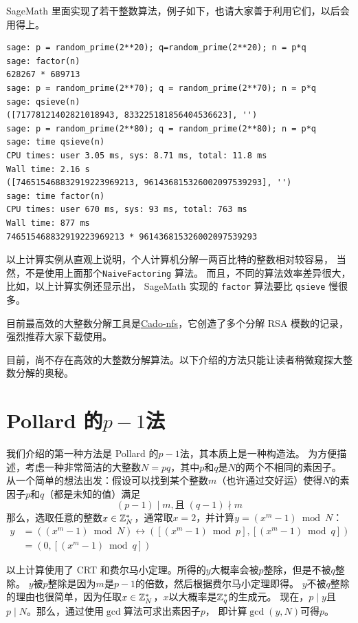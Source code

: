 SageMath 里面实现了若干整数算法，例子如下，也请大家善于利用它们，以后会用得上。
\begin{example}
\begin{lstlisting}
sage: p = random_prime(2**20); q=random_prime(2**20); n = p*q
sage: factor(n)
628267 * 689713
sage: p = random_prime(2**70); q = random_prime(2**70); n = p*q
sage: qsieve(n)
([71778121402821018943, 833225181856404536623], '')
sage: p = random_prime(2**80); q = random_prime(2**80); n = p*q
sage: time qsieve(n)
CPU times: user 3.05 ms, sys: 8.71 ms, total: 11.8 ms
Wall time: 2.16 s
([746515468832919223969213, 961436815326002097539293], '')
sage: time factor(n)
CPU times: user 670 ms, sys: 93 ms, total: 763 ms
Wall time: 877 ms
746515468832919223969213 * 961436815326002097539293
\end{lstlisting}
\end{example}
以上计算实例从直观上说明，个人计算机分解一两百比特的整数相对较容易，
当然，不是使用上面那个\lstinline{NaiveFactoring} 
算法。
而且，不同的算法效率差异很大，
比如，以上计算实例还显示出，
SageMath 实现的
\lstinline|factor|
算法要比 
\lstinline|qsieve| 
慢很多。

目前最高效的大整数分解工具是\href{http://cado-nfs.gforge.inria.fr/}{Cado-nfs}，它创造了多个分解 RSA 模数的记录，强烈推荐大家下载使用。

目前，尚不存在高效的大整数分解算法。以下介绍的方法只能让读者稍微窥探大整数分解的奥秘。
\section{\texorpdfstring{Pollard 的$p - 1$法}{Pollard 的p - 1法}}
\label{sec:pol_p}

我们介绍的第一种方法是 Pollard 的$p - 1$法，其本质上是一种构造法。
为方便描述，考虑一种非常简洁的大整数$N=pq$，其中$p$和$q$是$N$的两个不相同的素因子。
从一个简单的想法出发：假设可以找到某个整数$m$（也许通过交好运）使得$N$的素因子$p$和$q$（都是未知的值）满足
\[(p-1) \mid m, \text{且}\;(q - 1) \nmid m\]
那么，选取任意的整数$x\in {\mathbb Z}_N^*$，通常取$x = 2$，并计算$y = (x^m - 1) \bmod N$：
\begin{align*}
y &= ((x^m - 1) \bmod N) \leftrightarrow ([(x^m -1)  \bmod p], [(x^m -1) \bmod q])\\
   &= (0, [(x^m -1) \bmod q])
\end{align*}
 
以上计算使用了 CRT 和费尔马小定理。所得的$y$大概率会被$p$整除，但是不被$q$整除。
$y$被$p$整除是因为$m$是$p-1$的倍数，然后根据费尔马小定理即得。
$y$不被$q$整除的理由也很简单，因为任取$x\in {\mathbb Z}_N^*$，$x$以大概率是${\mathbb Z}_q^*$的生成元。
现在，$ p \mid y$且$p \mid N$。那么，通过使用$\gcd$算法可求出素因子$p$，
即计算$\gcd(y, N)$可得$p$。

